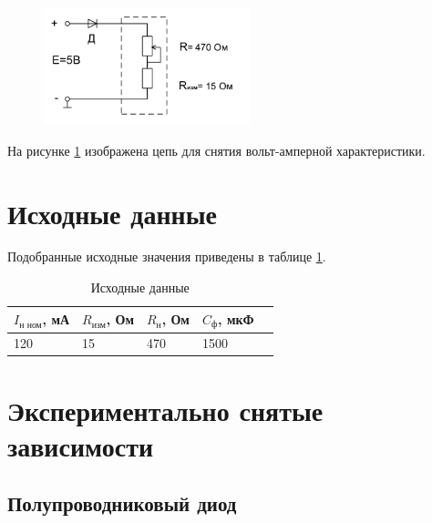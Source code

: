 \begin{figure}[H]
	\begin{center}
	\vspace{-0.5cm}
		\includegraphics[width=6cm]{img/vah}
		\caption{}
		\label{figure:2.2} %
	\vspace{-0.5cm}
	\end{center}
\end{figure}
На рисунке \ref{figure:2.2} изображена цепь для снятия вольт-амперной характеристики.

\section{Исходные данные}

Подобранные исходные значения приведены в таблице \ref{tabular:11}.

\begin{table}[H]
	\begin{center}
	\caption{Исходные данные}
	\def\arraystretch{1.5}
		\begin{tabularx}{\textwidth}{|X|X|X|X|X|}
			\hline
			$I_\text{н ном}$, мА & $R_\text{изм}$, Ом & $R_\text{н}$, Ом & $C_\text{ф}$, мкФ \\ \hline
		    120 & 15 & 470 & 1500\\\hline	
		\end{tabularx}
		\label{tabular:11}
	\end{center}
\end{table}



\section{Экспериментально снятые зависимости}

\subsection{Полупроводниковый диод}

